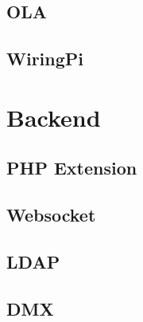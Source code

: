 \documentclass[
    headings=optiontotocandhead,%
    twoside,
    numbers=noenddot,%
    toc=flat, %
    12pt, %
    titlepage, %
    parskip=full, %
    listof=totoc, %
    listof=flat, %
    numbers=noenddot, %
    bibliography=totoc, %
    a4paper,DIV=14,
    BCOR=15mm,
]{scrbook}
\begin{document}


\section{OLA}\label{ola}

\renewcommand{\kapitelautor}{Autor: Clemens Scharwitzl}



\section{WiringPi}\label{WiringPi}

\renewcommand{\kapitelautor}{Autor: Clemens Scharwitzl}



\chapter{Backend}\label{Backend}

\section{PHP Extension}\label{PHP-Extension}

\renewcommand{\kapitelautor}{Autor: Clemens Scharwitzl}



\section{Websocket}\label{Websocket}

\renewcommand{\kapitelautor}{Autor: Clemens Scharwitzl}

    

\section{LDAP}\label{LDAP}

\renewcommand{\kapitelautor}{Autor: Clemens Scharwitzl}

% 

\section{DMX}\label{DMX}
\end{document}
